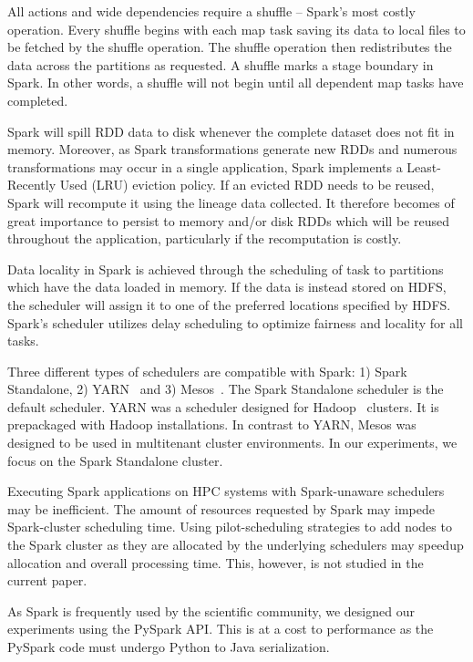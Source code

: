 \documentclass{IEEEtran}
\newcommand{\todo}[1]{\marginpar{\parbox{18mm}{\flushleft\tiny\color{red}\textbf{TODO}:
      #1}}}
\begin{document}
All actions and wide dependencies require a shuffle -- Spark's most costly
operation. Every shuffle begins with each map task saving its data to local
files to be fetched by the shuffle operation. The shuffle operation then 
redistributes the data across the partitions as requested. A shuffle marks a 
stage boundary in Spark. In other words, a shuffle will not begin until all 
dependent map tasks \todo{shouldn't it be 'actions'?} have completed.

Spark will spill RDD data to disk whenever the complete dataset does not fit in
memory. Moreover, as Spark transformations generate new RDDs and numerous 
transformations may occur in a single application, Spark implements a Least-Recently Used (LRU) eviction
policy. If an evicted RDD needs to be reused, Spark will recompute it using the
lineage data collected. It therefore becomes of great importance to persist to
memory and/or 
disk RDDs which will be reused throughout the application, particularly if the
recomputation is costly. 

Data locality in Spark is achieved through the  scheduling of task to partitions which have the
data loaded in memory. If the data is instead stored on HDFS, the scheduler will
assign it to one of the preferred locations specified by HDFS. Spark's scheduler
utilizes delay scheduling to optimize fairness and locality for all tasks.

Three different types of schedulers are compatible with Spark: 1) Spark 
Standalone, 2) YARN~\cite{vavilapalli2013apache} and 3) Mesos~\cite{hindman2011mesos}. The Spark Standalone
scheduler is the default scheduler. YARN was a scheduler designed for Hadoop~\cite{white2012hadoop}
clusters. It is prepackaged with Hadoop installations. In contrast to YARN, 
Mesos was designed to be used in multitenant cluster environments. In our experiments,
we focus on the Spark Standalone cluster.

Executing Spark applications on HPC systems with Spark-unaware schedulers may
be inefficient. The amount of resources requested by Spark may impede Spark-cluster
scheduling time. Using pilot-scheduling strategies to add nodes to the Spark cluster
as they are allocated by the underlying schedulers may speedup allocation and 
overall processing time. This, however, is not studied in the current paper.

As Spark is frequently used by the scientific community, we designed our 
experiments using the PySpark API. This is at a cost to performance as the PySpark
code must undergo Python to Java serialization.
\end{document}
